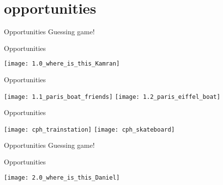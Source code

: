 \section{opportunities}

\begin{frame}{Opportunities}
Guessing game!
\end{frame}

\begin{frame}{Opportunities}
\begin{center}
\texttt{[image: 1.0\_where\_is\_this\_Kamran]}
\end{center}
\end{frame}

\begin{frame}{Opportunities}
\begin{center}
\texttt{[image: 1.1\_paris\_boat\_friends]}
\texttt{[image: 1.2\_paris\_eiffel\_boat]}
\end{center}
\end{frame}

\begin{frame}{Opportunities}
\begin{center}
\texttt{[image: cph\_trainstation]}
\texttt{[image: cph\_skateboard]}
\end{center}
\end{frame}

\begin{frame}{Opportunities}
Guessing game!
\end{frame}

\begin{frame}{Opportunities}
\begin{center}
\texttt{[image: 2.0\_where\_is\_this\_Daniel]}
\end{center}
\end{frame}

